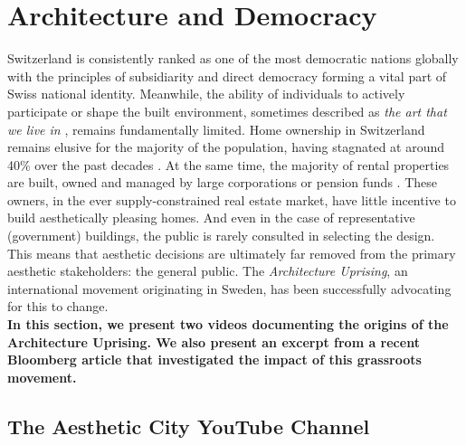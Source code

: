 \documentclass[a4paper]{article}
\begin{document}
\clearpage
\section{Architecture and Democracy}

\begin{mdframed}[linewidth=1pt, roundcorner=5pt, innerleftmargin=10pt, innerrightmargin=10pt, innertopmargin=10pt, innerbottommargin=10pt, linecolor=black, backgroundcolor=white, userdefinedwidth=\textwidth]
    Switzerland is consistently ranked as one of the most democratic nations globally \cite{noauthor_economist_2023} with the principles of subsidiarity and direct democracy forming a vital part of Swiss national identity. Meanwhile, the ability of individuals to actively participate or shape the built environment, sometimes described as \textit{the art that we live in} \cite{hughes_shock_1980}, remains fundamentally limited. Home ownership in Switzerland remains elusive for the majority of the population, having stagnated at around 40\% over the past decades \cite{noauthor_home_2022}. At the same time, the majority of rental properties are built, owned and managed by large corporations or pension funds \cite{noauthor_wem_nodate}. These owners, in the ever supply-constrained real estate market, have little incentive to build aesthetically pleasing homes. And even in the case of representative (government) buildings, the public is rarely consulted in selecting the design. This means that aesthetic decisions are ultimately far removed from the primary aesthetic stakeholders: the general public. The \textit{Architecture Uprising}, an international movement originating in Sweden, has been successfully advocating for this to change. \\
    \textbf{In this section, we present two videos documenting the origins of the Architecture Uprising. We also present an excerpt from a recent Bloomberg article that investigated the impact of this grassroots movement.}
\end{mdframed}

\subsection{The Aesthetic City YouTube Channel}
\end{document}
